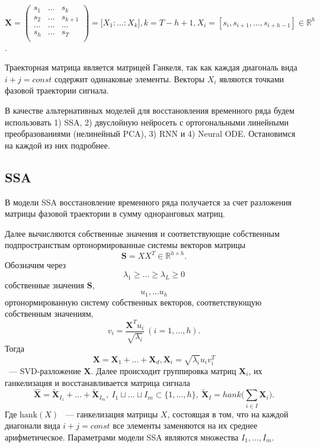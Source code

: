 \documentclass[12pt, twoside]{article}
\begin{document}
$\mathbf{X} = \begin{pmatrix}
s_1 & \dots & s_{k}\\
s_2 & \dots & s_{k+1}\\
\dots & \dots & \dots\\
s_{h} & \dots & s_{T}\\
\end{pmatrix} = \big[X_1 : \dots : X_k\big], k=T-h+1, X_i = [s_i, s_{i+1}, \dots, s_{i + h - 1}] \in \mathbb{R}^h$. 

Траекторная матрица является матрицей Ганкеля, так как каждая диагональ вида $i+j=const$ содержит одинаковые элементы. Векторы $X_i$ являются точками фазовой траектории сигнала. 

В качестве альтернативных моделей для восстановления временного ряда будем использовать 1) SSA, 2) двуслойную нейросеть с ортогональными линейными преобразованиями (нелинейный PCA), 3) RNN и 4) Neural ODE. Остановимся на каждой из них подробнее.

\subsection{SSA}

В модели SSA восстановление временного ряда получается за счет разложения матрицы фазовой траектории в сумму одноранговых матриц. 

Далее вычисляются собственные значения и соответствующие собственным подпространствам ортонормированные системы векторов матрицы \[\mathbf{S}=XX^T \in \mathbb{R}^{h \times h}.\] Обозначим через \[\lambda_1 \ge \dots \ge \lambda_L \ge 0\] собственные значения $\mathbf{S}$, \[u_1, \dots u_h\] ортонормированную систему собственных векторов, соответствующую собственным значениям, \[v_i = \frac{\mathbf{X}^Tu_i}{\sqrt{\lambda_i}} \ (i=1, \dots, h).\] Тогда \[\mathbf{X} = \mathbf{X}_1 + \dots + \mathbf{X}_d, \mathbf{X}_i = \sqrt{\lambda_i}u_iv_i^T\] ~--- SVD-разложение $\mathbf{X}$. Далее происходит группировка матриц $\mathbf{X}_i$, их ганкелизация и восстанавливается матрица сигнала \[\hat{\mathbf{X}} = \mathbf{\tilde{X}}_{I_1} + \dots + \mathbf{\tilde{X}}_{I_m}, \ I_1 \sqcup \dots \sqcup I_m \subset \{1, \dots, h\}, \ \mathbf{\tilde{X}}_{I} = hank\big(\sum\limits_{i \in I}\mathbf{X}_i\big).\] Где $\text{hank}(X)$ ~--- ганкелизация матрицы $X$, состоящая в том, что на каждой диагонали вида $i+j=const$ все элементы заменяются на их среднее арифметическое. Параметрами модели SSA являются множества $I_1, \dots, I_m$.
\end{document}
